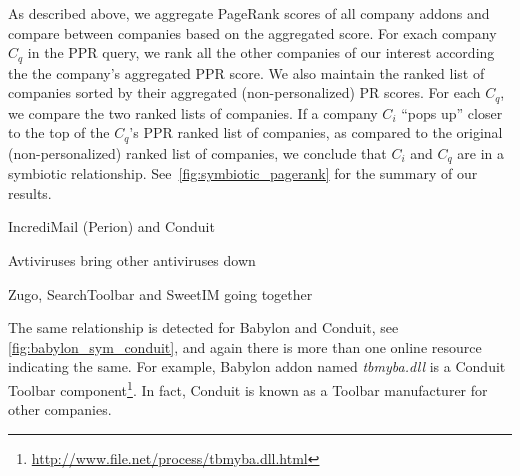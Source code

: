 \documentclass[11pt,oneside]{book}
\begin{document}

As described above, we aggregate PageRank scores of all company addons and compare between companies based on the aggregated score. For exach company $C_q$ in the PPR query, we rank all the other companies of our interest according the the company's aggregated PPR score. We also maintain the ranked list of companies sorted by their aggregated (non-personalized) PR scores. For each $C_q$, we compare the two ranked lists of companies. If a company $C_i$ ``pops up'' closer to the top of the $C_q$'s PPR ranked list of companies, as compared to the original (non-personalized) ranked list of companies, we conclude that $C_i$ and $C_q$ are in a symbiotic relationship. See~\autoref{fig:symbiotic_pagerank} for the summary of our results.


IncrediMail (Perion) and Conduit

Avtiviruses bring other antiviruses down

Zugo, SearchToolbar and SweetIM going together

The same relationship is detected for Babylon and Conduit, see \autoref{fig:babylon_sym_conduit}, and again there is more than one online resource indicating the same. For example, Babylon addon named \emph{tbmyba.dll} is a Conduit Toolbar component\footnote{\url{http://www.file.net/process/tbmyba.dll.html}}. In fact, Conduit is known as a Toolbar manufacturer for other companies.
\end{document}
